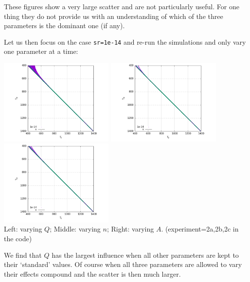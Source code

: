 These figures show a very large scatter and are not particularly useful. 
For one thing they do not provide us with an understanding of which of the three 
parameters is the dominant one (if any). 

Let us then focus on the case \lstinline{sr=1e-14} and re-run the simulations
and only vary one parameter at a time:

\begin{center}
\includegraphics[width=5.7cm]{python_codes/fieldstone_167/gltu95/envelope_2a/fig6.png}
\includegraphics[width=5.7cm]{python_codes/fieldstone_167/gltu95/envelope_2b/fig6.png}
\includegraphics[width=5.7cm]{python_codes/fieldstone_167/gltu95/envelope_2c/fig6.png}\\
{\captionfont Left: varying $Q$; Middle: varying $n$; Right: varying $A$.
(experiment=2a,2b,2c in the code)}
\end{center}

We find that $Q$ has the largest influence when all other parameters are kept to their 
`standard' values. Of course when all three parameters are allowed to vary their effects 
compound and the scatter is then much larger.


